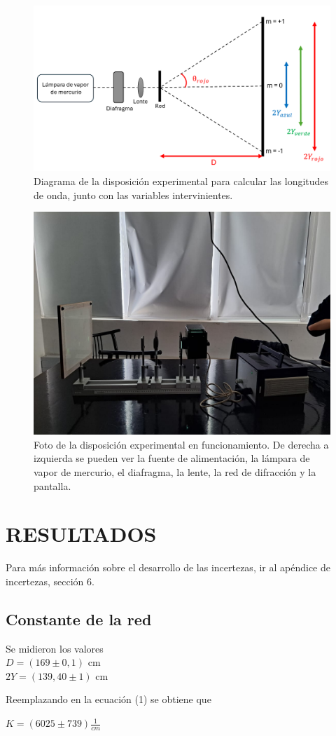 \documentclass[12pt, a4paper]{article}
\begin{document}
\begin{figure}[!h] 
        \centering \includegraphics[width=0.75\columnwidth]{diagramaExperimental2.png}
        \caption{\label{fig2}Diagrama de la disposición experimental para calcular las longitudes de onda, junto con las variables 
        intervinientes.}
\end{figure}

\begin{figure}[!h] 
        \centering \includegraphics[width=0.75\columnwidth]{dispositivo3.jpg}
        \caption{\label{fig3}Foto de la disposición experimental en funcionamiento. De derecha a izquierda se pueden ver la fuente de 
        alimentación, la lámpara de vapor de mercurio, el diafragma, la lente, la red de difracción y la pantalla.}
\end{figure}


\section{RESULTADOS}
Para más información sobre el desarrollo de las incertezas, ir al apéndice de incertezas, sección 6.

\subsection{Constante de la red}
Se midieron los valores 
\\ $D = (169 \pm 0,1)$ cm
\\ $2Y = (139,40 \pm 1)$ cm
\par Reemplazando en la ecuación (1) se obtiene que
\begin{center}
    $K = (6025 \pm 739) \frac{1}{cm}$
\end{center}
\end{document}
